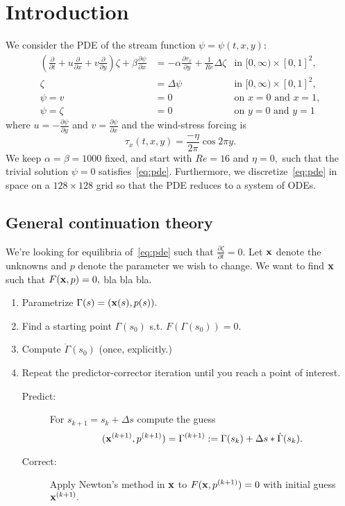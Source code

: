 \section{Introduction}

We consider the PDE of the stream function $\psi = \psi(t, x, y):$
\begin{equation}\label{eq:pde}
\begin{aligned}
  \left(\frac{\partial}{\partial t} + u \frac{\partial}{\partial x} + v \frac{\partial}{\partial y}\right) \zeta + \beta \frac{\partial \psi}{\partial x} &= -\alpha \frac{\partial \tau_x}{\partial y} + \frac{1}{Re} \Delta \zeta & \text{in } [0, \infty) \times [0,1]^2, \\
  \zeta &= \Delta \psi & \text{in } [0, \infty) \times [0,1]^2, \\
  \psi = v &= 0 & \text{on } x = 0 \text{ and } x = 1, \\
  \psi = \zeta &= 0 & \text{on } y = 0 \text{ and } y = 1
\end{aligned}
\end{equation}
where $u = -\frac{\partial \psi}{\partial y}$ and $v = \frac{\partial \psi}{\partial x}$ and the wind-stress forcing is
\begin{equation}
  \tau_x(t, x, y) = \frac{- \eta}{2 \pi} \cos{2\pi y}.
 \label{eq:tau}
\end{equation}
We keep $\alpha = \beta = 1000$ fixed, and start with $Re = 16$ and $\eta = 0,$ such that the trivial solution $\psi = 0$ satisfies~\eqref{eq:pde}. Furthermore, we discretize~\eqref{eq:pde} in space on a $128\times128$ grid so that the PDE reduces to a system of ODEs.

\subsection{General continuation theory}
We're looking for equilibria of~\eqref{eq:pde} such that $\frac{\partial \zeta}{\partial t} = 0.$ Let $\mathbf{x}$ denote the unknowns and $p$ denote the parameter we wish to change. We want to find $\mathbf{x}$ such that $F(\mathbf{x}, p) = 0,$ bla bla bla. 

\begin{enumerate}
  \item Parametrize $\Gamma(s) = (\mathbf{x}(s), p(s)).$
  \item Find a starting point $\Gamma(s_0)$ s.t. $F(\Gamma(s_0)) = 0.$
  \item Compute $\dot\Gamma(s_0)$ (once, explicitly.)
  \item Repeat the predictor-corrector iteration until you reach a point of interest.
  \begin{description}
    \item[Predict:] For $s_{k+1} = s_k + \Delta s$ compute the guess $$(\mathbf{x}^{(k+1)}, p^{(k+1)}) = \Gamma^{(k+1)} := \Gamma(s_k) + \Delta s * \dot\Gamma(s_k).$$
    \item[Correct:] Apply Newton's method in $\mathbf{x}$ to $F(\mathbf{x}, p^{(k+1)}) = 0$ with initial guess $\mathbf{x}^{(k+1)}.$
  \end{description}
\end{enumerate}